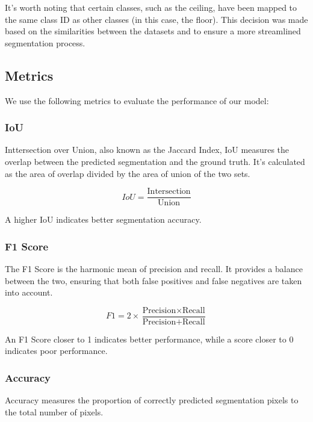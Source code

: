 \documentclass[11pt, a4paper,oneside,chapterprefix=false]{scrbook}
\begin{document}
It's worth noting that certain classes, such as the ceiling, have been mapped to the same class ID as other classes (in this case, the floor). This decision was made based on the similarities between the datasets and to ensure a more streamlined segmentation process.

\subsection{Metrics}

We use the following metrics to evaluate the performance of our model:

\subsubsection{IoU}

Inttersection over Union, also known as the Jaccard Index, IoU measures the overlap between the predicted segmentation and the ground truth. It's calculated as the area of overlap divided by the area of union of the two sets.

\begin{equation}
	IoU = \frac{\text{Intersection}}{\text{Union}}
\end{equation}

A higher IoU indicates better segmentation accuracy.

\subsubsection{F1 Score}

The F1 Score is the harmonic mean of precision and recall. It provides a balance between the two, ensuring that both false positives and false negatives are taken into account.

\begin{equation}
	F1 = 2 \times \frac{\text{Precision} \times \text{Recall}}{\text{Precision} + \text{Recall}}
\end{equation}

An F1 Score closer to 1 indicates better performance, while a score closer to 0 indicates poor performance.

\subsubsection{Accuracy}

Accuracy measures the proportion of correctly predicted segmentation pixels to the total number of pixels.
\end{document}
